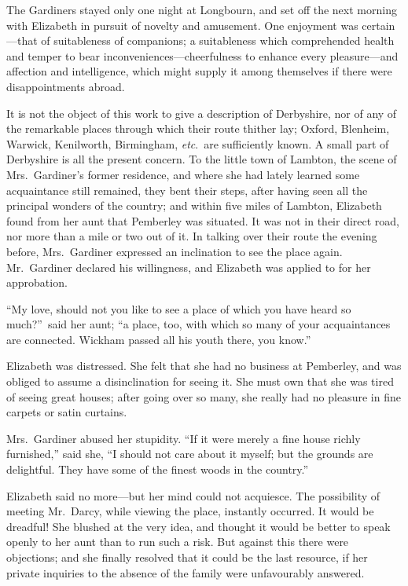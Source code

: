\documentclass[12pt,english,oneside]{book}
\begin{document}
The Gardiners stayed only one night at Longbourn, and set off the
next morning with Elizabeth in pursuit of novelty and amusement. One
enjoyment was certain\mbox{---}that of suitableness of companions;
a suitableness which comprehended health and temper to bear inconveniences\mbox{---}cheerfulness
to enhance every pleasure\mbox{---}and affection and intelligence,
which might supply it among themselves if there were disappointments
abroad.

It is not the object of this work to give a description of Derbyshire,
nor of any of the remarkable places through which their route thither
lay; Oxford, Blenheim, Warwick, Kenilworth, Birmingham, \textit{etc}.\ are
sufficiently known. A small part of Derbyshire is all the present
concern. To the little town of Lambton, the scene of Mrs.\ Gardiner's
former residence, and where she had lately learned some acquaintance
still remained, they bent their steps, after having seen all the principal
wonders of the country; and within five miles of Lambton, Elizabeth
found from her aunt that Pemberley was situated. It was not in their
direct road, nor more than a mile or two out of it. In talking over
their route the evening before, Mrs.\ Gardiner expressed an inclination
to see the place again. Mr.\ Gardiner declared his willingness, and
Elizabeth was applied to for her approbation.

{}``My love, should not you like to see a place of which you have
heard so much?''\ said her aunt; {}``a place, too, with which so
many of your acquaintances are connected. Wickham passed all his youth
there, you know.''

Elizabeth was distressed. She felt that she had no business at Pemberley,
and was obliged to assume a disinclination for seeing it. She must
own that she was tired of seeing great houses; after going over so
many, she really had no pleasure in fine carpets or satin curtains.

Mrs.\ Gardiner abused her stupidity. {}``If it were merely a fine
house richly furnished,'' said she, {}``I should not care about
it myself; but the grounds are delightful. They have some of the finest
woods in the country.''

Elizabeth said no more\mbox{---}but her mind could not acquiesce.
The possibility of meeting Mr.\ Darcy, while viewing the place, instantly
occurred. It would be dreadful! She blushed at the very idea, and
thought it would be better to speak openly to her aunt than to run
such a risk. But against this there were objections; and she finally
resolved that it could be the last resource, if her private inquiries
to the absence of the family were unfavourably answered.
\end{document}
